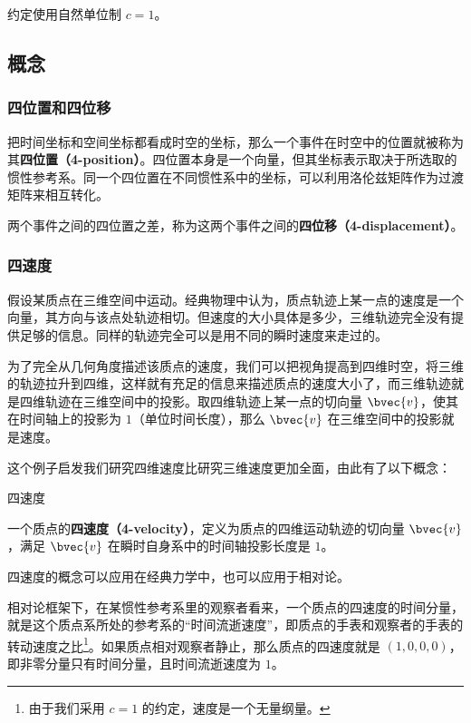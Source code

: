 

约定使用自然单位制 $c=1$。

\subsection{概念}
\subsubsection{四位置和四位移}
把时间坐标和空间坐标都看成时空的坐标，那么一个事件在时空中的位置就被称为其\textbf{四位置（4-position）}。四位置本身是一个向量，但其坐标表示取决于所选取的惯性参考系。同一个四位置在不同惯性系中的坐标，可以利用洛伦兹矩阵作为过渡矩阵来相互转化。

两个事件之间的四位置之差，称为这两个事件之间的\textbf{四位移（4-displacement）}。

\subsubsection{四速度}

假设某质点在三维空间中运动。经典物理中认为，质点轨迹上某一点的速度是一个向量，其方向与该点处轨迹相切。但速度的大小具体是多少，三维轨迹完全没有提供足够的信息。同样的轨迹完全可以是用不同的瞬时速度来走过的。

为了完全从几何角度描述该质点的速度，我们可以把视角提高到四维时空，将三维的轨迹拉升到四维，这样就有充足的信息来描述质点的速度大小了，而三维轨迹就是四维轨迹在三维空间中的投影。取四维轨迹上某一点的切向量 $\bvec{v}$，使其在时间轴上的投影为 $1$（单位时间长度），那么 $\bvec{v}$ 在三维空间中的投影就是速度。

这个例子启发我们研究四维速度比研究三维速度更加全面，由此有了以下概念：

\begin{definition}{四速度}

一个质点的\textbf{四速度（4-velocity）}，定义为质点的四维运动轨迹的切向量 $\bvec{v}$，满足 $\bvec{v}$ 在瞬时自身系中的时间轴投影长度是 $1$。 

\end{definition}

四速度的概念可以应用在经典力学中，也可以应用于相对论。

相对论框架下，在某惯性参考系里的观察者看来，一个质点的四速度的时间分量，就是这个质点系所处的参考系的“时间流逝速度”，即质点的手表和观察者的手表的转动速度之比\footnote{由于我们采用 $c=1$ 的约定，速度是一个无量纲量。}。如果质点相对观察者静止，那么质点的四速度就是 $(1,0,0,0)$，即非零分量只有时间分量，且时间流逝速度为 $1$。

